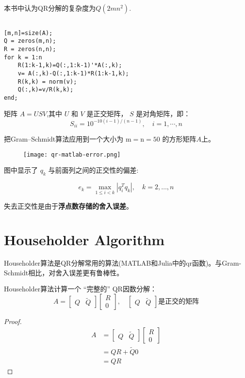 本书中认为QR分解的复杂度为$Q(2mn^2)$.

\begin{example}
    \begin{verbatim}

[m,n]=size(A);
Q = zeros(m,n);
R = zeros(n,n);
for k = 1:n
    R(1:k-1,k)=Q(:,1:k-1)'*A(:,k);
    v= A(:,k)-Q(:,1:k-1)*R(1:k-1,k);
    R(k,k) = norm(v);
    Q(:,k)=v/R(k,k);
end;
    \end{verbatim}

    矩阵 $ A=U S V $,其中 $ U $ 和 $ V $ 是正交矩阵， $ S $ 是对角矩阵，即：
    $$
    S_{i i}=10^{-10(i-1) /(n-1)}, \quad i=1, \cdots, n
    $$

    把Gram–Schmidt算法应用到一个大小为 $ \mathrm{m}=\mathrm{n}=50 $ 的方形矩阵$A$上。

    \begin{figure}[htbp]
        \centering
        \texttt{[image: qr-matlab-error.png]}
        
    \end{figure}

    图中显示了 $ q_{k} $ 与前面列之间的正交性的偏差:

    $$
    e_{k}=\max _{1 \leq i<k}\left|q_{i}^{T} q_{k}\right|, \quad k=2, \ldots, n
    $$

    失去正交性是由于\textbf{浮点数存储的舍入误差}。
\end{example}

\section{Householder Algorithm}

Householder算法是QR分解常用的算法(MATLAB和Julia中的qr函数)。与Gram-Schmidt相比，对舍入误差更有鲁棒性。

Householder算法计算一个 “完整的” QR因数分解：
$$ A=\left[\begin{array}{ll}Q & \tilde{Q}\end{array}\right]\left[\begin{array}{l}R \\ 0\end{array}\right], \quad\left[\begin{array}{ll}Q & \tilde{Q}\end{array}\right]  是正交的矩阵$$

\begin{proof}
    $$
    \begin{aligned}
        A&=\left[\begin{array}{ll}Q & \tilde{Q}\end{array}\right]\left[\begin{array}{l}R \\ 0\end{array}\right]\\
        &=QR + \tilde{Q} 0 \\ 
        & = QR
    \end{aligned}
    $$
\end{proof}

